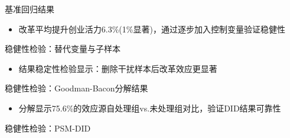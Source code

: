 \documentclass{beamer}
\newcommand{\tightlist}{%
  \setlength{\itemsep}{0pt}\setlength{\parskip}{0pt}}
\begin{document}
\begin{frame}{基准回归结果}
\label{ux57faux51c6ux56deux5f52ux7ed3ux679c}
\begin{adjustbox}{max width=0.95\textwidth}

\end{adjustbox}

\begin{itemize}
\tightlist
\item
  改革平均提升创业活力6.3\%(1\%显著)，通过逐步加入控制变量验证稳健性
\end{itemize}
\end{frame}

\begin{frame}{稳健性检验：替代变量与子样本}
\label{ux7a33ux5065ux6027ux68c0ux9a8cux66ffux4ee3ux53d8ux91cfux4e0eux5b50ux6837ux672c}
\vspace{-2mm}
\begin{adjustbox}{width=0.95\textwidth,center} 

\end{adjustbox}

\begin{itemize}
\tightlist
\item
  结果稳定性检验显示：删除干扰样本后改革效应更显著
\end{itemize}
\end{frame}

\begin{frame}{稳健性检验：Goodman-Bacon分解结果}
\label{ux7a33ux5065ux6027ux68c0ux9a8cgoodman-baconux5206ux89e3ux7ed3ux679c}
\begin{adjustbox}{max totalheight=0.7\textheight} 

\end{adjustbox}

\vspace{-2mm}

\begin{itemize}
\tightlist
\item
  分解显示75.6\%的效应源自处理组vs.未处理组对比，验证DID结果可靠性
\end{itemize}
\end{frame}

\begin{frame}{稳健性检验：PSM-DID}
\label{ux7a33ux5065ux6027ux68c0ux9a8cpsm-did}
\begin{adjustbox}{max totalheight=0.7\textheight} 

\end{adjustbox}

\vspace{-2mm}
\end{frame}
\end{document}
